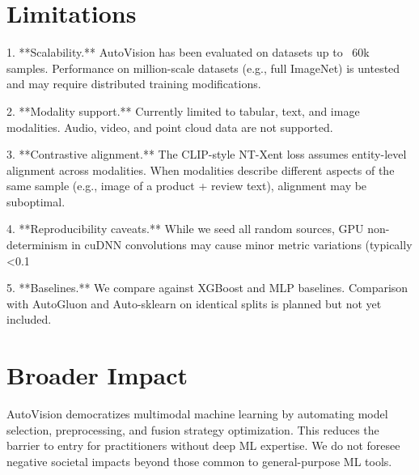 \documentclass{article}
\begin{document}
\section{Limitations}

1. **Scalability.** AutoVision has been evaluated on datasets up to ~60k samples.
   Performance on million-scale datasets (e.g., full ImageNet) is untested
   and may require distributed training modifications.

2. **Modality support.** Currently limited to tabular, text, and image
   modalities. Audio, video, and point cloud data are not supported.

3. **Contrastive alignment.** The CLIP-style NT-Xent loss assumes entity-level
   alignment across modalities. When modalities describe different aspects
   of the same sample (e.g., image of a product + review text), alignment
   may be suboptimal.

4. **Reproducibility caveats.** While we seed all random sources, GPU
   non-determinism in cuDNN convolutions may cause minor metric variations
   (typically <0.1%

5. **Baselines.** We compare against XGBoost and MLP baselines. Comparison
   with AutoGluon and Auto-sklearn on identical splits is planned but not
   yet included.

\section{Broader Impact}
AutoVision democratizes multimodal machine learning by automating model selection,
preprocessing, and fusion strategy optimization. This reduces the barrier
to entry for practitioners without deep ML expertise. We do not foresee
negative societal impacts beyond those common to general-purpose ML tools.



\end{document}
